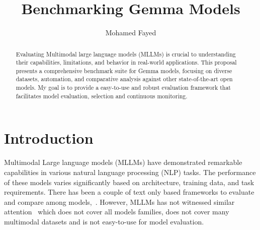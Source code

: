 \documentclass[
	letterpaper, %
]{jdf}
\author{Mohamed Fayed}
\title{Benchmarking Gemma Models}
\begin{document}
%
%
%

\maketitle
\begin{abstract}
    Evaluating Multimodal large language models (MLLMs) is crucial to understanding their capabilities, limitations, and behavior in real-world applications.
    This proposal presents a comprehensive benchmark suite for Gemma models, focusing on diverse datasets, automation, and comparative analysis against other state-of-the-art open models.
    My goal is to provide a easy-to-use and robust evaluation framework that facilitates model evaluation, selection and continuous monitoring.
     \end{abstract}

\section{Introduction}
Multimodal Large language models (MLLMs) have demonstrated remarkable capabilities in various natural language processing (NLP) tasks. 
The performance of these models varies significantly based on architecture, training data, and task requirements.
There has been a couple of text only based frameworks to evaluate and compare among models\cite{eval-harness},~\cite{hf-openllmleaderboard}.
However, MLLMs has not witnessed similar attention~\cite{lmms-eval2024} which does not cover all models families, does not cover many multimodal datasets and is not easy-to-use for model evaluation.
\end{document}
